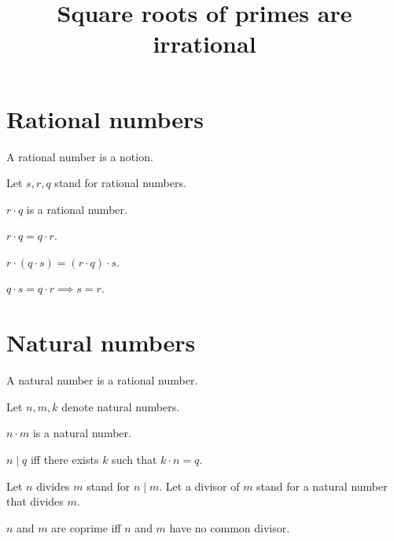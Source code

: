 \documentclass{article}
\title{Square roots of primes are irrational}
\author{}
\date{}
\begin{document}
  \maketitle

  \section*{Rational numbers}

  \begin{forthel}

    \begin{signature}
      A rational number is a notion.
    \end{signature}

    Let $s,r,q$ stand for rational numbers.

    \begin{signature}
      $r \cdot q$ is a rational number.
    \end{signature}

    \begin{axiom}
      $r \cdot q = q \cdot r$.
    \end{axiom}

    \begin{axiom}
      $r \cdot (q \cdot s) = (r \cdot q) \cdot s$.
    \end{axiom}

    \begin{axiom}
      $q \cdot s = q \cdot r \implies s = r$.
    \end{axiom}
  \end{forthel}

  \section*{Natural numbers}

  \begin{forthel}
    \begin{signature}
      A natural number is a rational number.
    \end{signature}

    Let $n,m,k$ denote natural numbers.

    \begin{axiom}
      $n \cdot m$ is a natural number.
    \end{axiom}

    \begin{definition}
      $n \mid q$ iff there exists $k$ such that $k \cdot n = q$.
    \end{definition}

    Let $n$ divides $m$ stand for $n \mid m$. Let a divisor of $m$ stand for a natural number that divides $m$.

    \begin{definition}
      $n$ and $m$ are coprime iff $n$ and $m$ have no common divisor.
    \end{definition}
  \end{forthel}
\end{document}
